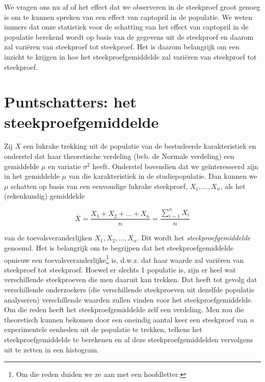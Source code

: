 \documentclass[
  12pt,dutch,coursenotes]{book}
\begin{document}
We vragen ons nu af of het effect dat we observeren in de steekproef groot genoeg is om te kunnen spreken van een effect van captopril in de populatie.
We weten immers dat onze statistiek voor de schatting van het effect van captopril in de populatie berekend wordt op basis van de gegevens uit de steekproef en daarom zal variëren van steekproef tot steekproef.
Het is daarom belangrijk om een inzicht te krijgen in hoe het steekproefgemiddelde zal variëren van steekproef tot steekproef.

\hypertarget{puntschatters-het-steekproefgemiddelde}{%
\section{Puntschatters: het steekproefgemiddelde}\label{puntschatters-het-steekproefgemiddelde}}

Zij \(X\) een lukrake trekking uit de populatie van de bestudeerde karakteristiek en onderstel dat haar theoretische verdeling (bvb. de Normale verdeling) een gemiddelde \(\mu\) en variatie \(\sigma^2\) heeft.
Onderstel bovendien dat we geïnteresseerd zijn in het gemiddelde \(\mu\) van die karakteristiek in de studiepopulatie.
Dan kunnen we \(\mu\) schatten op basis van een eenvoudige lukrake steekproef, \(X_1,...,X_n\), als het (rekenkundig) gemiddelde

\begin{equation*}
\bar X = \frac{X_1+ X_2+ ... + X_n}{n} = \frac{\sum_{i=1}^{n} X_i}{n}
\end{equation*}

van de toevalsveranderlijken \(X_1,X_2, ..., X_n\).
Dit wordt het \emph{steekproefgemiddelde} genoemd.
Het is belangrijk om te begrijpen dat het
steekproefgemiddelde opnieuw een toevalsveranderlijke\footnote{Om die reden duiden we ze aan met een hoofdletter.} is, d.w.z. dat haar
waarde zal variëren van steekproef tot steekproef. Hoewel er
slechts 1 populatie is, zijn er heel wat verschillende steekproeven die men
daaruit kan trekken. Dat heeft tot gevolg dat verschillende onderzoekers
(die verschillende steekproeven uit dezelfde populatie analyseren)
verschillende waarden zullen vinden voor het steekproefgemiddelde. Om die
reden heeft het steekproefgemiddelde zelf een verdeling.
Men zou die theoretisch kunnen bekomen door een oneindig aantal keer een steekproef van \(n\) experimentele eenheden uit de populatie te trekken, telkens het steekproefgemiddelde te berekenen en al deze steekproefgemiddelden vervolgens uit te zetten in een histogram.
\end{document}
